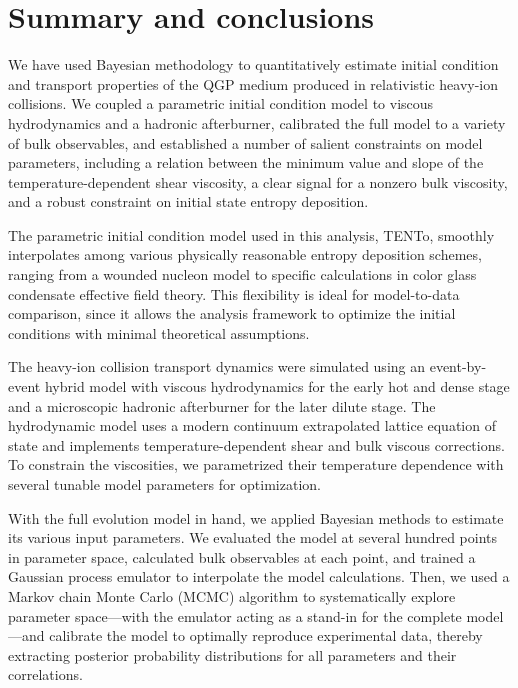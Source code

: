 \documentclass[aps,prc,reprint,amsmath,nofootinbib,noeprint]{revtex4-1}
\newcommand{\trento}{T\raisebox{-0.5ex}{R}ENTo}
\begin{document}
\section{Summary and conclusions}

We have used Bayesian methodology to quantitatively estimate initial condition and transport properties of the QGP medium produced in relativistic heavy-ion collisions.
We coupled a parametric initial condition model to viscous hydrodynamics and a hadronic afterburner, calibrated the full model to a variety of bulk observables, and established a number of salient constraints on model parameters, including a relation between the minimum value and slope of the temperature-dependent shear viscosity, a clear signal for a nonzero bulk viscosity, and a robust constraint on initial state entropy deposition.

The parametric initial condition model used in this analysis, \trento, smoothly interpolates among various physically reasonable entropy deposition schemes, ranging from a wounded nucleon model to specific calculations in color glass condensate effective field theory.
This flexibility is ideal for model-to-data comparison, since it allows the analysis framework to optimize the initial conditions with minimal theoretical assumptions.

The heavy-ion collision transport dynamics were simulated using an event-by-event hybrid model with viscous hydrodynamics for the early hot and dense stage and a microscopic hadronic afterburner for the later dilute stage.
The hydrodynamic model uses a modern continuum extrapolated lattice equation of state and implements temperature-dependent shear and bulk viscous corrections.
To constrain the viscosities, we parametrized their temperature dependence with several tunable model parameters for optimization.

With the full evolution model in hand, we applied Bayesian methods to estimate its various input parameters.
We evaluated the model at several hundred points in parameter space, calculated bulk observables at each point, and trained a Gaussian process emulator to interpolate the model calculations.
Then, we used a Markov chain Monte Carlo (MCMC) algorithm to systematically explore parameter space---with the emulator acting as a stand-in for the complete model---and calibrate the model to optimally reproduce experimental data, thereby extracting posterior probability distributions for all parameters and their correlations.
\end{document}
